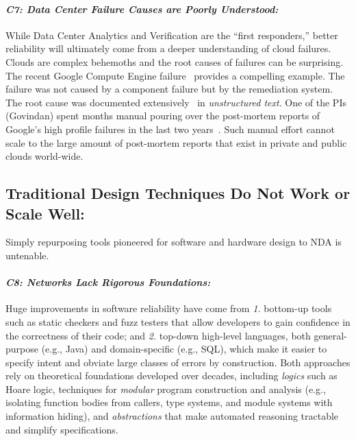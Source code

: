 \paragraph*{\em C7: Data Center Failure Causes are Poorly Understood:}
While Data Center Analytics and Verification are the ``first responders,'' better reliability will ultimately come from a deeper understanding of cloud failures.  Clouds are complex behemoths and the root causes of failures can be surprising. The recent Google Compute Engine failure~\cite{googlefailure} provides a compelling example.  The failure was not caused by a component failure but by the remediation system. The root cause was documented extensively~\cite{googlefailure} in {\em unstructured text}.
One of the PIs (Govindan) spent months manual pouring over the post-mortem reports of Google's high profile failures in the last two years~\cite{rameshgoogle}. Such manual effort cannot scale to the large amount of post-mortem reports that exist in private and  public clouds world-wide.

\subsection{Traditional Design Techniques Do Not Work or Scale Well:}
%
Simply repurposing tools pioneered for software and hardware design to NDA is untenable.

\paragraph{\em C8: Networks Lack Rigorous Foundations:}  Huge improvements in software reliability have come from  {\em 1.} bottom-up tools such as static checkers and fuzz testers that allow developers to gain confidence in the correctness of their code; and {\em 2.} top-down high-level languages, both general-purpose (e.g., Java) and domain-specific (e.g., SQL), which make it easier to specify intent and  obviate large classes of errors by construction. Both approaches rely on theoretical foundations developed over decades, including {\em logics} such as Hoare logic, techniques for {\em modular} program construction and analysis (e.g., isolating function bodies from callers, type systems, and module systems with information hiding), and {\em abstractions} that make automated reasoning tractable and simplify specifications.

